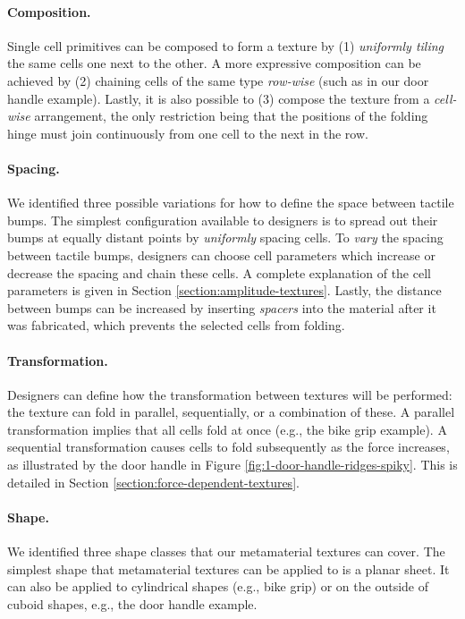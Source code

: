 \paragraph{Composition.} Single cell primitives can be composed to form a texture by (1) \textit{uniformly tiling} the same cells one next to the other. A more expressive composition can be achieved by (2) chaining cells of the same type \textit{row-wise} (such as in our door handle example). Lastly, it is also possible to (3) compose the texture from a \textit{cell-wise} arrangement, the only restriction being that the positions of the folding hinge must join continuously from one cell to the next in the row.

\paragraph{Spacing.} We identified three possible variations for how to define the space between tactile bumps. The simplest configuration available to designers is to spread out their bumps at equally distant points by \textit{uniformly} spacing cells. To \textit{vary} the spacing between tactile bumps, designers can choose cell parameters which increase or decrease the spacing and chain these cells. A complete explanation of the cell parameters is given in Section \ref{section:amplitude-textures}. Lastly, the distance between bumps can be increased by inserting \textit{spacers} into the material after it was fabricated, which prevents the selected cells from folding. 

\paragraph{Transformation.} Designers can define how the transformation between textures will be performed: the texture can fold in parallel, sequentially, or a combination of these. A parallel transformation implies that all cells fold at once (e.g., the bike grip example). A sequential transformation causes cells to fold subsequently as the force increases, as illustrated by the door handle in Figure \ref{fig:1-door-handle-ridges-spiky}. This is detailed in Section \ref{section:force-dependent-textures}.

\paragraph{Shape.} We identified three shape classes that our metamaterial textures can cover. The simplest shape that metamaterial textures can be applied to is a planar sheet. It can also be applied to cylindrical shapes (e.g., bike grip) or on the outside of cuboid shapes, e.g., the door handle example. 

